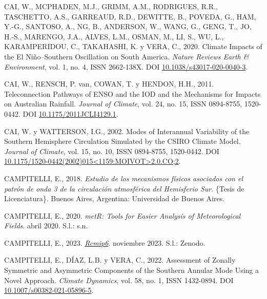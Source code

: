 \documentclass[12pt,oneside,a4paper]{reedthesis}
\newlength{\cslhangindent}
\newenvironment{CSLReferences}[2] %
 {%
  \setlength{\parindent}{0pt}
  \ifodd #1 \everypar{\setlength{\hangindent}{\cslhangindent}}\ignorespaces\fi
  \ifnum #2 > 0
  \setlength{\parskip}{#2\baselineskip}
  \fi
 }%
 {}
\begin{document}
\begin{CSLReferences}{1}{0}
\leavevmode{}%
CAI, W., MCPHADEN, M.J., GRIMM, A.M., RODRIGUES, R.R., TASCHETTO, A.S., GARREAUD, R.D., DEWITTE, B., POVEDA, G., HAM, Y.-G., SANTOSO, A., NG, B., ANDERSON, W., WANG, G., GENG, T., JO, H.-S., MARENGO, J.A., ALVES, L.M., OSMAN, M., LI, S., WU, L., KARAMPERIDOU, C., TAKAHASHI, K. y VERA, C., 2020. Climate Impacts of the {El Ni{ñ}o}--{Southern Oscillation} on {South America}. \emph{Nature Reviews Earth \& Environment}, vol. 1, no. 4, ISSN 2662-138X. DOI \href{https://doi.org/10.1038/s43017-020-0040-3}{10.1038/s43017-020-0040-3}.

\leavevmode{}%
CAI, W., RENSCH, P. van, COWAN, T. y HENDON, H.H., 2011. Teleconnection {Pathways} of {ENSO} and the {IOD} and the {Mechanisms} for {Impacts} on {Australian Rainfall}. \emph{Journal of Climate}, vol. 24, no. 15, ISSN 0894-8755, 1520-0442. DOI \href{https://doi.org/10.1175/2011JCLI4129.1}{10.1175/2011JCLI4129.1}.

\leavevmode{}%
CAI, W. y WATTERSON, I.G., 2002. Modes of {Interannual Variability} of the {Southern Hemisphere Circulation Simulated} by the {CSIRO Climate Model}. \emph{Journal of Climate}, vol. 15, no. 10, ISSN 0894-8755, 1520-0442. DOI \href{https://doi.org/10.1175/1520-0442(2002)015\%3C1159:MOIVOT\%3E2.0.CO;2}{10.1175/1520-0442(2002)015\textless1159:MOIVOT\textgreater2.0.CO;2}.

\leavevmode{}%
CAMPITELLI, E., 2018. \emph{{Estudio de los mecanismos f{í}sicos asociados con el patr{ó}n de onda 3 de la circulaci{ó}n atmosf{é}rica del Hemisferio Sur}}. \{Tesis de Licenciatura\}. Buenos Aires, Argentina: Universidad de Buenos Aires.

\leavevmode{}%
CAMPITELLI, E., 2020. \emph{{metR}: {Tools} for {Easier Analysis} of {Meteorological Fields}}. abril 2020. S.l.: s.n.

\leavevmode{}%
CAMPITELLI, E., 2023. \emph{\href{https://doi.org/10.5281/zenodo.10138834}{Rcmip6}}. noviembre 2023. S.l.: Zenodo.

\leavevmode{}%
CAMPITELLI, E., DÍAZ, L.B. y VERA, C., 2022. Assessment of Zonally Symmetric and Asymmetric Components of the {Southern Annular Mode} Using a Novel Approach. \emph{Climate Dynamics}, vol. 58, no. 1, ISSN 1432-0894. DOI \href{https://doi.org/10.1007/s00382-021-05896-5}{10.1007/s00382-021-05896-5}.


\end{CSLReferences}
\end{document}
